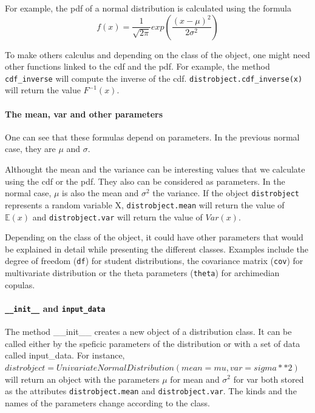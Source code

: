 \documentclass{article}
\begin{document}
	For example, the pdf of a normal distribution is calculated using the formula
	\begin{equation*}
	f(x) = \frac{1}{\sqrt{2\pi}}exp(\frac{(x-\mu)^2}{2\sigma^2})
	\end{equation*}
	
	To make others calculus and depending on the class of the object, one might need other functions linked to the cdf and the pdf. For example, the method \texttt{cdf\_inverse}  will compute the inverse of the cdf. \texttt{distrobject.cdf\_inverse(x)} will return the value $F^{-1}(x)$.	
	
	
	\paragraph{The mean, var and other parameters}	
	One can see that these formulas depend on parameters. In the previous normal case, they are $\mu$ and $\sigma$. \newline
	
	Althought the mean and the variance can be interesting values that we calculate using the cdf or the pdf. They also can be considered as parameters. In the normal case, $\mu$ is also the mean and $\sigma^2$ the variance. If the object \texttt{distrobject} represents a random variable X, \texttt{distrobject.mean} will return the value of $\mathbb{E}(x)$ and \texttt{distrobject.var} will return the value of $Var(x)$. \newline
	 
	 Depending on the class of the object, it could have other parameters that would be explained in detail while presenting the different classes. Examples include the degree of freedom (\texttt{df}) for student distributions, the covariance matrix (\texttt{cov}) for multivariate distribution or the theta parameters (\texttt{theta}) for archimedian copulas.
	 
	\paragraph{\texttt{\_\_init\_\_} and \texttt{input\_data}}
	
	The method \_\_init\_\_ creates a new object of a distribution class. It can be called either by the speficic parameters of the distribution or with a set of data called input\_data. For instance, $distrobject = UnivariateNormalDistribution(mean=mu,var=sigma**2)$ will return an object with the parameters $\mu$  for mean and $\sigma^2$ for var both stored as the attributes \texttt{distrobject.mean} and \texttt{distrobject.var}. The kinds and the names of the parameters change according to the class.
	
\end{document}
